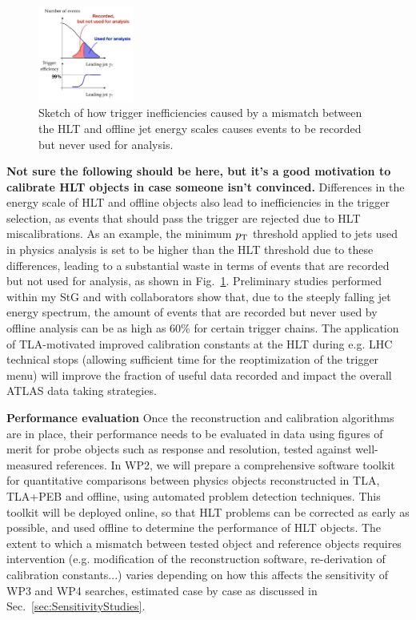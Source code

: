 \begin{figure} 
\begin{center}
\includegraphics[width=0.28\textwidth]{figs_B2/efficiencySketch}
\caption{\color{black}\label{fig:wastedRate} \small Sketch of how trigger inefficiencies caused by a mismatch between the HLT and offline jet energy scales causes events to be recorded but never used for analysis.} %
\vskip2pt
\end{center}
\end{figure}
\color{red}\textbf{Not sure the following should be here, but it's a good motivation to calibrate HLT objects in case someone isn't convinced. }\color{black} 
Differences in the energy scale of HLT and offline objects also lead to inefficiencies in the trigger selection, as events that should pass the trigger are rejected due to HLT miscalibrations. 
As an example, the minimum $p_{\rm{T}}$ threshold applied to jets used in physics analysis is set to be higher than the HLT threshold due to these differences, leading to a substantial waste in terms of events that are recorded but not used for analysis, as shown in Fig.~\ref{fig:wastedRate}. 
Preliminary studies performed within my StG and with collaborators show that, due to the steeply falling jet energy spectrum, the amount of events that are recorded but never used by offline analysis can be as high as 60\% for certain trigger chains. 
The application of TLA-motivated improved calibration constants at the HLT during e.g. LHC technical stops (allowing sufficient time for the reoptimization of the trigger menu) will improve the fraction of useful data recorded and impact the overall ATLAS data taking strategies. 

\textbf{Performance evaluation} Once the reconstruction and calibration algorithms are in place, their performance needs to be evaluated in data using figures of merit for probe objects such as response and resolution, tested against well-measured references. 
In WP2, we will prepare a comprehensive software toolkit for quantitative comparisons between physics objects reconstructed in TLA, TLA+PEB and offline, using automated problem detection techniques. 
This toolkit will be deployed online, so that HLT problems can be corrected as early as possible, and used offline to determine the performance of HLT objects.  
The extent to which a mismatch between tested object and reference objects requires intervention (e.g. modification of the reconstruction software, re-derivation of calibration constants...) varies depending on how this affects the sensitivity of WP3 and WP4 searches, estimated case by case as discussed in Sec.~\ref{sec:SensitivityStudies}.
 
